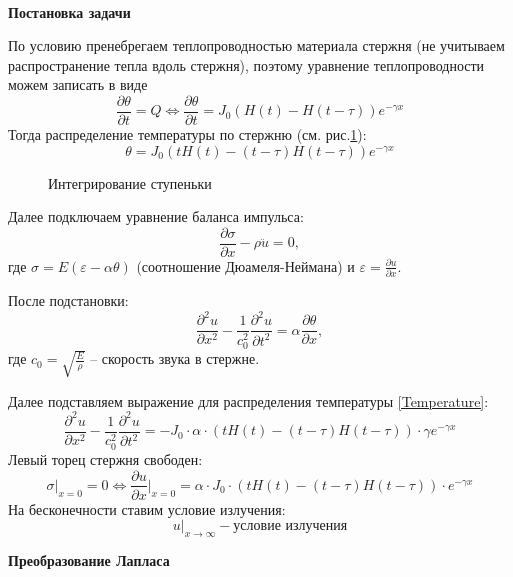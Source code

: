 \documentclass[a4paper, 11pt]{article}
\newcommand{\beq}{\begin{equation}}
\newcommand{\eeq}{\end{equation}}
\newenvironment{solution}
    {\textit{}}
    {}
\begin{document}
\begin{solution}\\
\textbf{Постановка задачи}

По условию пренебрегаем теплопроводностью материала стержня (не учитываем распространение тепла вдоль стержня), поэтому уравнение теплопроводности можем записать в виде
\beq
\frac{\partial\theta}{\partial t}=Q\Leftrightarrow\frac{\partial\theta}{\partial t}=J_0(H(t)-H(t-\tau))e^{-\gamma x}
\eeq
Тогда распределение температуры по стержню (см. рис.\ref{fig:integrate}):
\beq\label{Temperature}
\theta=J_0\left(tH(t)-(t-\tau)H(t-\tau)\right)e^{-\gamma x}
\eeq
\begin{figure}[h]
\centering
{}
\caption{Интегрирование ступеньки}
\label{fig:integrate}
\end{figure}


Далее подключаем уравнение баланса импульса:
\beq
\frac{\partial\sigma}{\partial x}-\rho\ddot{u}=0,
\eeq
где $\sigma=E\left(\varepsilon-\alpha\theta\right)$ (соотношение Дюамеля-Неймана) и $\displaystyle{}\varepsilon=\frac{\partial u}{\partial x}$.

После подстановки:
\beq
\frac{\partial^2u}{\partial x^2}-\frac{1}{c_0^2}\frac{\partial^2u}{\partial t^2}=\alpha\frac{\partial\theta}{\partial x},
\eeq
где $\displaystyle{}c_0=\sqrt{\frac{E}{\rho}}$ -- скорость звука в стержне.

Далее подставляем выражение для распределения температуры \eqref{Temperature}:
\beq
\frac{\partial^2u}{\partial x^2}-\frac{1}{c_0^2}\frac{\partial^2u}{\partial t^2}=-J_0\cdot\alpha\cdot\left(tH(t)-(t-\tau)H(t-\tau)\right)\cdot\gamma e^{-\gamma x}
\eeq
Левый торец стержня свободен:
\beq
\sigma|_{x=0}=0\Leftrightarrow\frac{\partial u}{\partial x}\bigg|_{x=0}=\alpha\cdot J_0\cdot\left(tH(t)-(t-\tau)H(t-\tau)\right)\cdot e^{-\gamma x}
\eeq
На бесконечности ставим условие излучения:
\beq
u|_{x\rightarrow\infty} -\text{условие излучения}
\eeq

\textbf{Преобразование Лапласа}

\end{solution}
\end{document}

